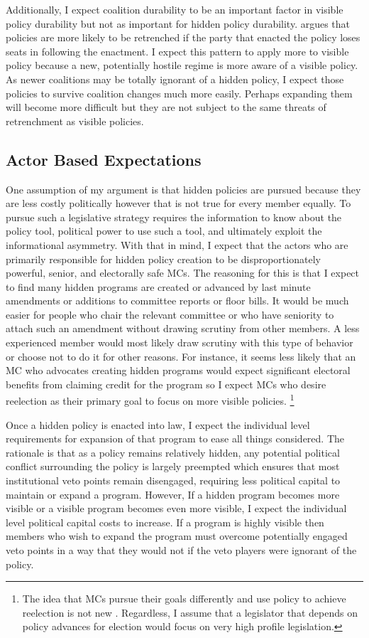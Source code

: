 \documentclass[12pt]{article}
\begin{document}
Additionally, I expect coalition durability to be an important factor in visible policy durability but not as important for hidden policy durability. \citet{berry2012} argues that policies are more likely to be retrenched if the party that enacted the policy loses seats in following the enactment. I expect this pattern to apply more to visible policy because a new, potentially hostile regime is more aware of a visible policy. As newer coalitions may be totally ignorant of a hidden policy, I expect those policies to survive coalition changes much more easily. Perhaps expanding them will become more difficult but they are not subject to the same threats of retrenchment as visible policies.

\subsection{Actor Based Expectations}
One assumption of my argument is that hidden policies are pursued because they are less costly politically however that is not true for every member equally. To pursue such a legislative strategy requires the information to know about the policy tool, political power to use such a tool, and ultimately exploit the informational asymmetry. With that in mind, I expect that the actors who are primarily responsible for hidden policy creation to be disproportionately powerful, senior, and electorally safe MCs. The reasoning for this is that I expect to find many hidden programs are created or advanced by last minute amendments or additions to committee reports or floor bills. It would be much easier for people who chair the relevant committee or who have seniority to attach such an amendment without drawing scrutiny from other members. A less experienced member would most likely draw scrutiny with this type of behavior or choose not to do it for other reasons. For instance, it seems less likely that an MC who advocates creating hidden programs would expect significant electoral benefits from claiming credit for the program so I expect MCs who desire reelection as their primary goal to focus on more visible policies. \footnote{
The idea that MCs pursue their goals differently and use policy to achieve reelection is not new \citep{fenno1973, kernell1999}. Regardless, I assume that a legislator that depends on policy advances for election would focus on very high profile legislation.} 

Once a hidden policy is enacted into law, I expect the individual level requirements for expansion of that program to ease all things considered. The rationale is that as a policy remains relatively hidden, any potential political conflict surrounding the policy is largely preempted which ensures that most institutional veto points remain disengaged, requiring less political capital to maintain or expand a program. However, If a hidden program becomes more visible or a visible program becomes even more visible, I expect the individual level political capital costs to increase. If a program is highly visible then members who wish to expand the program must overcome potentially engaged veto points in a way that they would not if the veto players were ignorant of the policy. 
\end{document}
